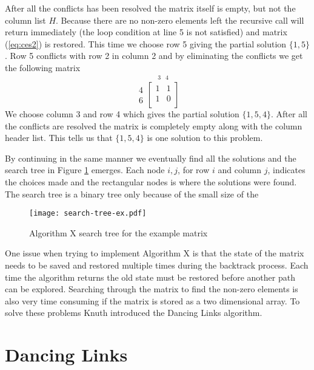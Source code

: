 After all the conflicts has been resolved the matrix itself is empty, but not the column list $H$.
Because there are no non-zero elements left the recursive call will return immediately (the loop condition at line 5 is not satisfied) and matrix (\ref{eq:ces2}) is restored.
This time we choose row 5 giving the partial solution $\{ 1, 5 \}$.
Row 5 conflicts with row 2 in column 2 and by eliminating the conflicts we get the following matrix
\begin{equation}
	\label{eq:ces3}
	\begin{array}{r} 4\\ 6 \end{array}
	\stackrel{
		\begin{array}{ccc} 3 & 4 \end{array}
	}{
		\begin{bmatrix}
			1 & 1 \\
			1 & 0 \\
		\end{bmatrix}
	}
\end{equation}
We choose column 3 and row 4 which gives the partial solution $\{ 1, 5, 4 \}$.
After all the conflicts are resolved the matrix is completely empty along with the column header list.
This tells us that $\{ 1, 5, 4 \}$ is one solution to this problem.

By continuing in the same manner we eventually find all the solutions and the search tree in Figure \ref{fig:ex_tree} emerges.
Each node $i,j$, for row $i$ and column $j$, indicates the choices made and the rectangular nodes is where the solutions were found.
The search tree is a binary tree only because of the small size of the 
\begin{figure}[H]
	\centering 
	\texttt{[image: search-tree-ex.pdf]}
	\caption{Algorithm X search tree for the example matrix}
	\label{fig:ex_tree}
\end{figure}

One issue when trying to implement Algorithm X is that the state of the matrix needs to be saved and restored multiple times during the backtrack process.
Each time the algorithm returns the old state must be restored before another path can be explored.
Searching through the matrix to find the non-zero elements is also very time consuming if the matrix is stored as a two dimensional array.
To solve these problems Knuth introduced the Dancing Links algorithm.



\section{Dancing Links}
\label{dlx}

